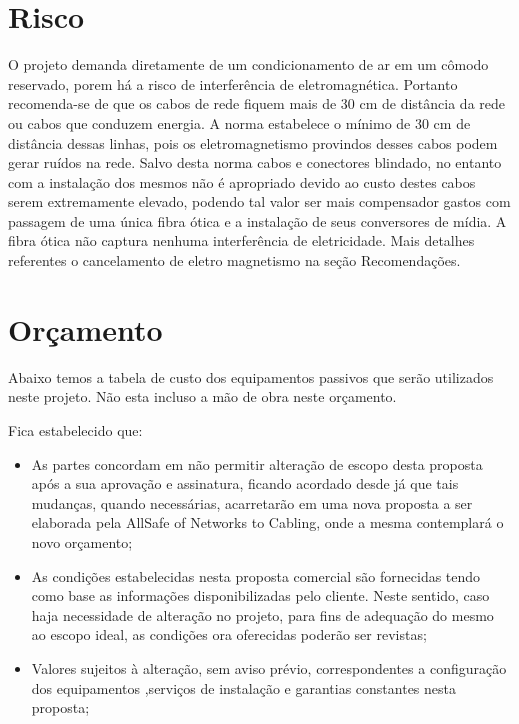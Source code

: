 \documentclass[	DIV=calc,%
							paper=a4,%
							fontsize=12pt,%
							onecolumn]{scrartcl}	 					%
\begin{document}
\section{Risco}
O projeto demanda diretamente de um condicionamento de ar em um cômodo reservado, porem há a risco de interferência de eletromagnética.
Portanto recomenda-se de que os cabos de rede fiquem mais de 30 cm de distância da rede ou cabos que conduzem energia. A norma estabelece o mínimo de 30 cm de distância dessas linhas, pois os eletromagnetismo provindos desses cabos podem gerar ruídos na rede. Salvo desta norma cabos e conectores blindado, no entanto com a instalação dos mesmos não é apropriado devido ao custo destes cabos serem extremamente elevado, podendo tal valor ser mais compensador gastos com passagem de uma única fibra ótica e a instalação de seus conversores de mídia. A fibra ótica não captura nenhuma interferência de eletricidade. Mais detalhes referentes o cancelamento de eletro magnetismo na seção Recomendações.

\section{Orçamento}
Abaixo temos a tabela de custo dos equipamentos passivos que serão utilizados neste projeto. Não esta incluso a mão de obra neste orçamento. 

Fica estabelecido que:
\begin{itemize}
\item As partes concordam em não permitir alteração de escopo desta proposta após a sua aprovação e assinatura, ficando acordado desde já que tais mudanças, quando necessárias, acarretarão em uma nova proposta a ser elaborada pela AllSafe of Networks to Cabling, onde a mesma contemplará o novo orçamento;

\item As condições estabelecidas nesta proposta comercial são fornecidas tendo como base as informações disponibilizadas pelo cliente. Neste sentido, caso haja necessidade de alteração no projeto, para fins de adequação do mesmo ao escopo ideal, as condições ora oferecidas poderão ser revistas;

\item Valores sujeitos à alteração, sem aviso prévio, correspondentes a configuração dos equipamentos ,serviços de instalação e garantias constantes nesta proposta;

\end{itemize}
\end{document}
